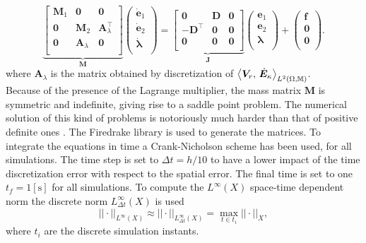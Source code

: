\begin{equation*}
\underbrace{
\begin{bmatrix}
\mathbf{M}_1 & \mathbf{0} & \mathbf{0}\\
\mathbf{0} & \mathbf{M}_2 & \mathbf{A}_\lambda^\top\\
\mathbf{0} & \mathbf{A}_\lambda & \mathbf{0} \\
\end{bmatrix}}_{\mathbf{M}}
\begin{pmatrix}
\dot{\mathbf{e}}_1 \\
\dot{\mathbf{e}}_2 \\
\dot{\bm{\lambda}} \\
\end{pmatrix} = 
\underbrace{
\begin{bmatrix}
\mathbf{0} & \mathbf{D} & \mathbf{0}\\
-\mathbf{D}^\top & \mathbf{0} & \mathbf{0} \\
\mathbf{0} & \mathbf{0} & \mathbf{0} \\
\end{bmatrix}}_{\mathbf{J}}
\begin{pmatrix}
{\mathbf{e}}_1 \\
{\mathbf{e}}_2 \\
\bm{\lambda} \\
\end{pmatrix} + 
\begin{pmatrix}
\mathbf{f} \\
\mathbf{0} \\
\mathbf{0} \\
\end{pmatrix}. 
\end{equation*}
where $\mathbf{A}_\lambda$ is the matrix obtained by discretization of $\inner[L^2(\Omega, \mathbb{M})]{\bm{V}_r}{\dot{\bm{E}}_\kappa}$. \\
Because of the presence of the Lagrange multiplier, the mass matrix $\mathbf{M}$ is symmetric and indefinite, giving rise to a saddle point problem. The numerical solution of this kind of problems is notoriously much harder than that of positive definite ones \cite{benzi2005}. The Firedrake library \cite{rathgeber2017firedrake} is used to generate the matrices. To integrate the equations in time a Crank-Nicholson scheme has been used, for all simulations. The time step is set to $\Delta t = h/10$ to have a lower impact of the time discretization error with respect to the spatial error. The final time is set to one $t_f = 1 [\textrm{s}]$ for all simulations. To compute the $L^\infty ({X})$ space-time dependent norm  the discrete norm $L^\infty_{\Delta t} ({X})$ is used
\[
||\cdot ||_{L^\infty ({X})} \approx || \cdot ||_{L^\infty_{\Delta t} ({X})} = \max_{t \in t_i} ||\cdot||_{{X}},
\]
where $t_i$ are the discrete simulation instants. 
